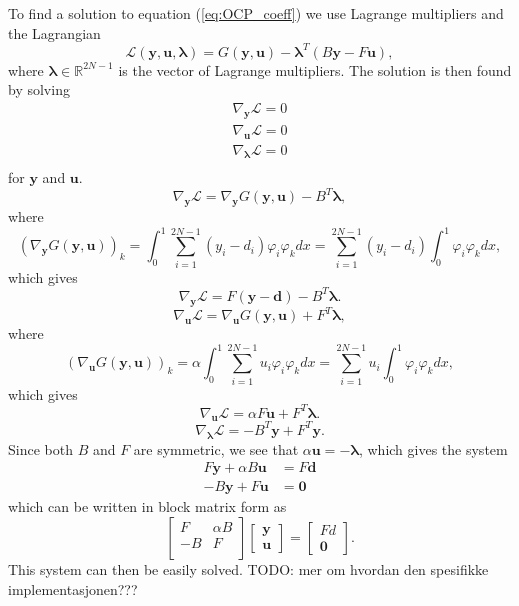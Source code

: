 To find a solution to equation (\ref{eq:OCP_coeff}) we use Lagrange multipliers and the Lagrangian
\begin{equation}
    \label{eq:OCP_lagrangian}
    \mathcal{L}(\mathbf{y, u, \lambda}) = G(\mathbf{y, u}) - \mathbf{\lambda}^T \left( B\mathbf{y} - F\mathbf{u} \right),
\end{equation}
where $\mathbf{\lambda} \in \mathds{R}^{2N-1}$ is the vector of Lagrange multipliers.
The solution is then found by solving
\begin{align}
    \label{eq:gradients}
    \nabla_{\mathbf{y}}\mathcal{L} = 0 \\
    \nabla_{\mathbf{u}}\mathcal{L} = 0 \\
    \nabla_{\mathbf{\mathbf{\lambda}}}\mathcal{L} = 0 \\
\end{align}
for $\mathbf{y}$ and $\mathbf{u}$.
$$\nabla_{\mathbf{y}}\mathcal{L} = \nabla_\mathbf{y}G(\mathbf{y, u}) - B^T\mathbf{\lambda},$$
where 
$$\left( \nabla_\mathbf{y}G(\mathbf{y, u}) \right)_k = \int_0^1\sum_{i=1}^{2N-1}(y_i - d_i) \varphi_i \varphi_k dx = \sum_{i=1}^{2N-1} (y_i - d_i) \int_0^1\varphi_i \varphi_k dx ,$$
which gives 
$$\nabla_{\mathbf{y}}\mathcal{L} = F(\mathbf{y} - \mathbf{d}) - B^T\mathbf{\lambda}.$$
$$\nabla_{\mathbf{u}}\mathcal{L} = \nabla_\mathbf{u}G(\mathbf{y, u}) + F^T\mathbf{\lambda},$$
where
$$\left( \nabla_\mathbf{u}G(\mathbf{y, u}) \right)_k = \alpha \int_0^1\sum_{i=1}^{2N-1} u_i  \varphi_i \varphi_k dx = \sum_{i=1}^{2N-1} u_i \int_0^1\varphi_i \varphi_k dx ,$$
which gives
$$\nabla_{\mathbf{u}}\mathcal{L} = \alpha F\mathbf{u} + F^T\mathbf{\lambda}.$$
$$\nabla_{\mathbf{\lambda}}\mathcal{L} = -B^T \mathbf{y} + F^T \mathbf{y}.$$
Since both $B$ and $F$ are symmetric, we see that $\alpha \mathbf{u}= -\mathbf{\lambda}$, which gives the system
\begin{align}
    \label{eq:lagrange_conditions}
     F \mathbf{y} + \alpha B \mathbf{u} &= F\mathbf{d} \\
    -B \mathbf{y} + F \mathbf{u} &= \mathbf{0}
\end{align}
which can be written in block matrix form as
$$
\begin{bmatrix}
   F & \alpha B \\
   -B & F \\
\end{bmatrix}
\begin{bmatrix}
    \mathbf{y} \\
    \mathbf{u}
\end{bmatrix}
= 
\begin{bmatrix}
    Fd \\
    \mathbf{0}
\end{bmatrix}.
$$
This system can then be easily solved.
TODO: mer om hvordan den spesifikke implementasjonen???

